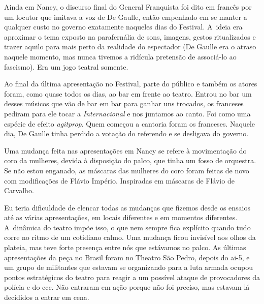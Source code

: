 Ainda em Nancy, o discurso final do General Franquista foi dito em
francês por um locutor que imitava a voz de De Gaulle, então empenhado
em se manter a qualquer custo no governo exatamente naqueles dias do
Festival. A~ideia era aproximar o tema exposto na parafernália de sons,
imagens, gestos ritualizados e trazer aquilo para mais perto da realidade
do espectador (De Gaulle era o atraso naquele momento, mas nunca tivemos
a ridícula pretensão de associá-lo ao fascismo). Era um jogo teatral
somente.

Ao final da última apresentação no Festival, parte do público e também os
atores foram, como quase todos os dias, ao bar em frente ao teatro.
Entrou no bar um desses músicos que vão de bar em bar para ganhar uns
trocados, os franceses pediram para ele tocar a {\it Internacional} e
nos juntamos ao canto. Foi como uma espécie de efeito {\it agitprop}. Quem
começou a cantoria foram os franceses. Naquele dia, De Gaulle tinha
perdido a votação do referendo e se desligava do governo.

Uma mudança feita nas apresentações em Nancy se refere à
movimentação do coro da mulheres, devida à disposição do palco, que tinha um
fosso de orquestra. Se não estou enganado, as máscaras das mulheres do
coro foram feitas de novo com modificações de Flávio Império.
Inspiradas em máscaras de Flávio de Carvalho.

Eu teria dificuldade de elencar todas as mudanças que fizemos desde os
ensaios até as várias apresentações, em locais diferentes e em momentos
diferentes. A~dinâmica do teatro impõe isso, o que nem sempre fica
explícito quando tudo corre no ritmo de um cotidiano calmo. Uma mudança
ficou invisível aos olhos da plateia, mas teve forte presença entre nós
que estávamos no palco. As últimas apresentações da peça no Brasil foram
no Theatro São Pedro, depois do {\sc ai}-5, e um grupo de
militantes que estavam se organizando para a luta armada ocupou pontos
estratégicos do teatro para reagir a um possível ataque de provocadores
da polícia e do {\sc ccc}. Não entraram em ação porque não foi preciso, mas
estavam lá decididos a entrar em cena.

